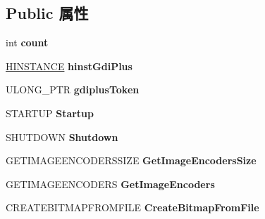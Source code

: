 \subsection*{Public 属性}
\begin{DoxyCompactItemize}
\item 
\mbox{\label{struct_a_t_l_1_1_c_image_1_1_c_o_m_m_o_n_adeb6a520c791bc0aaa4c13d2b378626c}} 
int {\bfseries count}
\item 
\mbox{\label{struct_a_t_l_1_1_c_image_1_1_c_o_m_m_o_n_a16b301a27047bf65737d48499e73607c}} 
\hyperlink{interfacevoid}{H\+I\+N\+S\+T\+A\+N\+CE} {\bfseries hinst\+Gdi\+Plus}
\item 
\mbox{\label{struct_a_t_l_1_1_c_image_1_1_c_o_m_m_o_n_a17dfc07ac4cac4db35ebdd08ea1fb97f}} 
U\+L\+O\+N\+G\+\_\+\+P\+TR {\bfseries gdiplus\+Token}
\item 
\mbox{\label{struct_a_t_l_1_1_c_image_1_1_c_o_m_m_o_n_aecd4dd03f47520420cd7bc657c1fdca3}} 
S\+T\+A\+R\+T\+UP {\bfseries Startup}
\item 
\mbox{\label{struct_a_t_l_1_1_c_image_1_1_c_o_m_m_o_n_a6fdb8bc6e02da35838aea0a65c9401b3}} 
S\+H\+U\+T\+D\+O\+WN {\bfseries Shutdown}
\item 
\mbox{\label{struct_a_t_l_1_1_c_image_1_1_c_o_m_m_o_n_acfcd4368545f3f9bd3eb5d9c9f9b2570}} 
G\+E\+T\+I\+M\+A\+G\+E\+E\+N\+C\+O\+D\+E\+R\+S\+S\+I\+ZE {\bfseries Get\+Image\+Encoders\+Size}
\item 
\mbox{\label{struct_a_t_l_1_1_c_image_1_1_c_o_m_m_o_n_a1942d51ce98553c98925b28114bc702c}} 
G\+E\+T\+I\+M\+A\+G\+E\+E\+N\+C\+O\+D\+E\+RS {\bfseries Get\+Image\+Encoders}
\item 
\mbox{\label{struct_a_t_l_1_1_c_image_1_1_c_o_m_m_o_n_a783b0a669ce847850cb27e15bd606f52}} 
C\+R\+E\+A\+T\+E\+B\+I\+T\+M\+A\+P\+F\+R\+O\+M\+F\+I\+LE {\bfseries Create\+Bitmap\+From\+File}
\item 

\end{DoxyCompactItemize}

